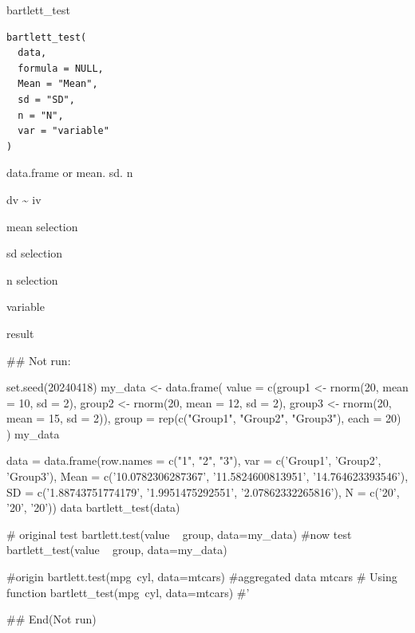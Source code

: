 \documentclass[a4paper]{book}
\begin{document}
%
\begin{Description}
bartlett\_test
\end{Description}
%
\begin{Usage}
\begin{verbatim}
bartlett_test(
  data,
  formula = NULL,
  Mean = "Mean",
  sd = "SD",
  n = "N",
  var = "variable"
)
\end{verbatim}
\end{Usage}
%
\begin{Arguments}
\begin{ldescription}
\item[\code{data}] data.frame or mean. sd. n

\item[\code{formula}] dv \textasciitilde{} iv

\item[\code{Mean}] mean selection

\item[\code{sd}] sd selection

\item[\code{n}] n selection

\item[\code{var}] variable
\end{ldescription}
\end{Arguments}
%
\begin{Value}
result
\end{Value}
%
\begin{Examples}
\begin{ExampleCode}

\#\# Not run: 

set.seed(20240418)
my_data <- data.frame(
  value = c(group1 <- rnorm(20, mean = 10, sd = 2),
            group2 <- rnorm(20, mean = 12, sd = 2),
            group3 <- rnorm(20, mean = 15, sd = 2)),
  group = rep(c("Group1", "Group2", "Group3"), each = 20)
)
my_data %

data = data.frame(row.names = c("1", "2", "3"),
                  var = c('Group1', 'Group2', 'Group3'),
                  Mean = c('10.0782306287367', '11.5824600813951', '14.764623393546'),
                  SD = c('1.88743751774179', '1.9951475292551', '2.07862332265816'),
                  N = c('20', '20', '20'))
data
bartlett_test(data)

# original test
bartlett.test(value ~ group, data=my_data)
#now test
bartlett_test(value ~ group, data=my_data)


#origin
bartlett.test(mpg~cyl, data=mtcars)
#aggregated data
mtcars%
# Using function
bartlett_test(mpg~cyl, data=mtcars)
#'

## End(Not run)
\end{ExampleCode}
\end{Examples}
\end{document}

